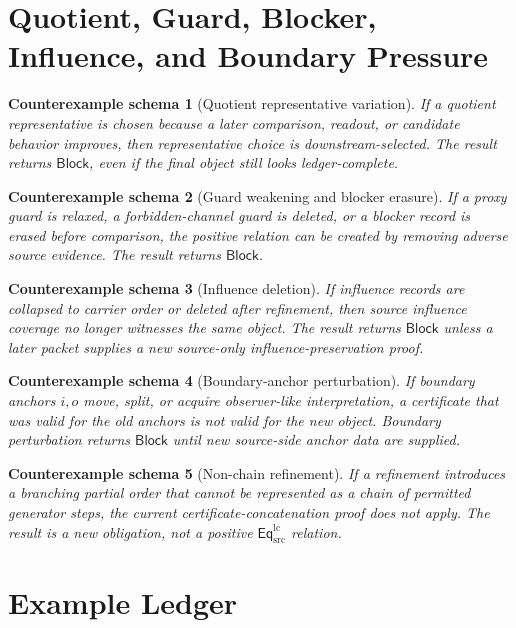 \documentclass[11pt]{article}
\newcommand{\EqLC}{\mathsf{Eq}_{\mathrm{src}}^{\mathrm{lc}}}
\newcommand{\Block}{\mathsf{Block}}
\newtheorem{counterexample}{Counterexample schema}
\begin{document}
\section{Quotient, Guard, Blocker, Influence, and Boundary Pressure}

\begin{counterexample}[Quotient representative variation]
If a quotient representative is chosen because a later comparison,
readout, or candidate behavior improves, then representative choice is
downstream-selected. The result returns \(\Block\), even if the final
object still looks ledger-complete.
\end{counterexample}

\begin{counterexample}[Guard weakening and blocker erasure]
If a proxy guard is relaxed, a forbidden-channel guard is deleted, or a
blocker record is erased before comparison, the positive relation can be
created by removing adverse source evidence. The result returns
\(\Block\).
\end{counterexample}

\begin{counterexample}[Influence deletion]
If influence records are collapsed to carrier order or deleted after
refinement, then source influence coverage no longer witnesses the same
object. The result returns \(\Block\) unless a later packet supplies a
new source-only influence-preservation proof.
\end{counterexample}

\begin{counterexample}[Boundary-anchor perturbation]
If boundary anchors \(i,o\) move, split, or acquire observer-like
interpretation, a certificate that was valid for the old anchors is not
valid for the new object. Boundary perturbation returns \(\Block\) until
new source-side anchor data are supplied.
\end{counterexample}

\begin{counterexample}[Non-chain refinement]
If a refinement introduces a branching partial order that cannot be
represented as a chain of permitted generator steps, the current
certificate-concatenation proof does not apply. The result is a new
obligation, not a positive \(\EqLC\) relation.
\end{counterexample}

\section{Example Ledger}
\end{document}
